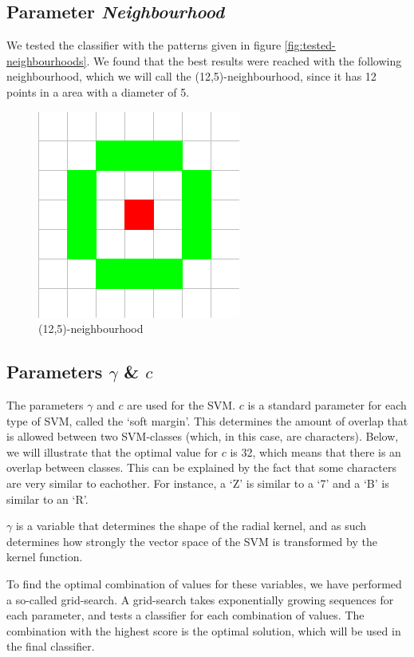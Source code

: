 \documentclass[a4paper]{article}
\begin{document}
\subsection{Parameter \emph{Neighbourhood}}

We tested the classifier with the patterns given in figure
\ref{fig:tested-neighbourhoods}. We found that the best results were reached
with the following neighbourhood, which we will call the (12,5)-neighbourhood,
since it has 12 points in a area with a diameter of 5.

\begin{figure}[H]
    \center
    \includegraphics[scale=0.5]{12-5neighbourhood.png}
    \caption{(12,5)-neighbourhood}
\end{figure}

\subsection{Parameters $\gamma$ \& $c$}

The parameters $\gamma$ and $c$ are used for the SVM. $c$ is a standard
parameter for each type of SVM, called the `soft margin'. This determines the
amount of overlap that is allowed between two SVM-classes (which, in this case,
are characters). Below, we will illustrate that the optimal value for $c$ is
32, which means that there is an overlap between classes. This can be explained
by the fact that some characters are very similar to eachother. For instance, a
`Z' is similar to a `7' and a `B' is similar to an `R'.

$\gamma$ is a variable that determines the shape of the radial kernel, and as
such determines how strongly the vector space of the SVM is transformed by the
kernel function.

To find the optimal combination of values for these variables, we have
performed a so-called grid-search. A grid-search takes exponentially growing
sequences for each parameter, and tests a classifier for each combination of
values. The combination with the highest score is the optimal solution, which
will be used in the final classifier.
\end{document}
